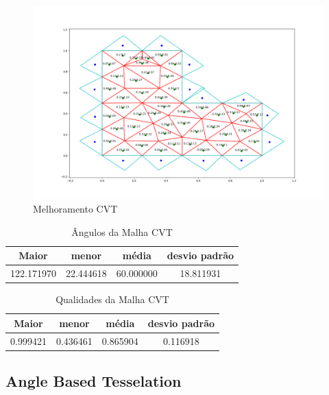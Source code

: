\begin{figure}[ht]
    \centering
    \includegraphics[width=1\linewidth]{fig/malha-cvt.png}
    \caption{Melhoramento CVT}
    \label{fig:malha-cvt}
\end{figure}

\begin{table}[hb]
\centering
\par\caption{Ângulos da Malha CVT}
\begin{tabular}{c|c|c|c}
Maior&menor&média&desvio padrão\\\hline\hline
122.171970&22.444618&60.000000&18.811931\\\hline
\end{tabular}
\label{tab:angulos-malha-cvt}
\end{table}

\begin{table}[hb]
\centering
\par\caption{Qualidades da Malha CVT}
\begin{tabular}{c|c|c|c}
Maior&menor&média&desvio padrão\\\hline\hline
0.999421&0.436461&0.865904&0.116918\\\hline
\end{tabular}
\label{tab:qualidades-malha-cvt}
\end{table}

\newpage
\subsection{Angle Based Tesselation}

